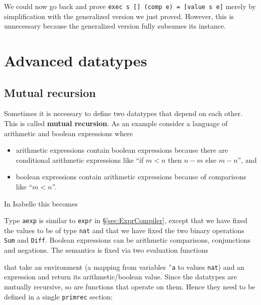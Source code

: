 We could now go back and prove \texttt{exec s [] (comp e) = [value s e]}
merely by simplification with the generalized version we just proved.
However, this is unnecessary because the generalized version fully subsumes
its instance.


\section{Advanced datatypes}

\subsection{Mutual recursion}

Sometimes it is necessary to define two datatypes that depend on each
other. This is called \textbf{mutual recursion}. As an example consider a
language of arithmetic and boolean expressions where
\begin{itemize}
\item arithmetic expressions contain boolean expressions because there are
  conditional arithmetic expressions like ``if $m<n$ then $n-m$ else $m-n$'',
  and
\item boolean expressions contain arithmetic expressions because of
  comparisons like ``$m<n$''.
\end{itemize}
In Isabelle this becomes
\begin{ttbox}
\end{ttbox}
Type \texttt{aexp} is similar to \texttt{expr} in \S\ref{sec:ExprCompiler},
except that we have fixed the values to be of type \texttt{nat} and that we
have fixed the two binary operations \texttt{Sum} and \texttt{Diff}. Boolean
expressions can be arithmetic comparisons, conjunctions and negations.
The semantics is fixed via two evaluation functions
\begin{ttbox}
\end{ttbox}
that take an environment (a mapping from variables \texttt{'a} to values
\texttt{nat}) and an expression and return its arithmetic/boolean
value. Since the datatypes are mutually recursive, so are functions that
operate on them. Hence they need to be defined in a single \texttt{primrec}
section:
\begin{ttbox}

\end{ttbox}


